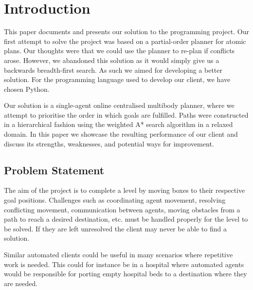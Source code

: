 \section{Introduction}
\label{sec:introduction}


This paper documents and presents our solution to the programming project.
Our first attempt to solve the project was based on a partial-order planner for atomic plans.
Our thoughts were that we could use the planner to re-plan if conflicts arose.
However, we abandoned this solution as it would simply give us a backwards breadth-first search. 
As such we aimed for developing a better solution.
For the programming language used to develop our client, we have chosen Python.

Our solution is a single-agent online centralised multibody planner, where we attempt to prioritise the order in which goals are fulfilled.
Paths were constructed in a hierarchical fashion using the weighted A* search algorithm in a relaxed domain.
In this paper we showcase the resulting performance of our client and discuss its strengths, weaknesses, and potential ways for improvement.

\subsection{Problem Statement}

The aim of the project is to complete a level by moving boxes to their respective goal positions.
Challenges such as coordinating agent movement, resolving conflicting movement, communication between agents, moving obstacles from a path to reach a desired destination, etc. must be handled properly for the level to be solved.
If they are left unresolved the client may never be able to find a solution.

Similar automated clients could be useful in many scenarios where repetitive work is needed.
This could for instance be in a hospital where automated agents would be responsible for porting empty hospital beds to a destination where they are needed.




